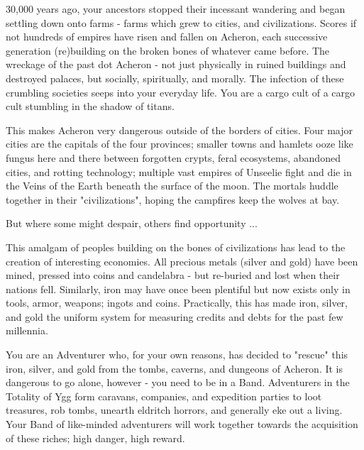 {  


  30,000 years ago, your ancestors stopped their incessant wandering and began settling down onto farms - farms which grew to cities, and civilizations.  Scores if not hundreds of empires have risen and fallen on Acheron, each successive generation (re)building on the broken bones of whatever came before.  The wreckage of the past dot Acheron - not just physically in ruined buildings and destroyed palaces, but socially, spiritually, and morally.  The infection of these crumbling societies seeps into your everyday life.  You are a cargo cult of a cargo cult stumbling in the shadow of titans.

  This makes Acheron very dangerous outside of the borders of cities.  Four major cities are the capitals of the four provinces; smaller towns and hamlets ooze like fungus here and there between forgotten crypts, feral ecosystems, abandoned cities, and rotting technology; multiple vast empires of Unseelie fight and die in the Veins of the Earth beneath the surface of the moon.  The mortals huddle together in their "civilizations", hoping the campfires keep the wolves at bay.

  But where some might despair, others find opportunity ...  



  This amalgam of peoples building on the bones of civilizations has lead to the creation of interesting economies.  All precious metals (silver and gold) have been mined, pressed into coins and candelabra - but re-buried and lost when their nations fell.  Similarly, iron may have once been plentiful but now exists only in tools, armor, weapons; ingots and coins.  Practically, this has made iron, silver, and gold the uniform system for measuring credits and debts for the past few millennia.

  You are an Adventurer who, for your own reasons, has decided to "rescue" this iron, silver, and gold from the tombs, caverns, and dungeons of Acheron.  It is dangerous to go alone, however - you need to be in a Band.  Adventurers in the Totality of Ygg form caravans, companies, and expedition parties to loot treasures, rob tombs, unearth eldritch horrors, and generally eke out a living.  Your Band of like-minded adventurers will work together towards the acquisition of these riches; high danger, high reward.  


}
